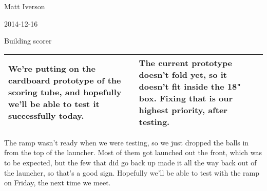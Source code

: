 Matt Iverson

2014-12-16

Building scorer

\begin{tabular}{|p{5cm}|p{5cm}|}
 \hline
 We're putting on the cardboard prototype of the scoring tube, and hopefully we'll be able to test it successfully today. &
 The current prototype doesn't fold yet, so it doesn't fit inside the 18" box. Fixing that is our highest priority, after testing. \\
 \hline
\end{tabular}

The ramp wasn't ready when we were testing, so we just dropped the balls in from the top of the launcher. Most of them got launched out the front, which was to be expected, but the few that did go back up made it all the way back out of the launcher, so that's a good sign. Hopefully we'll  be able to test with the ramp on Friday, the next time we meet.
